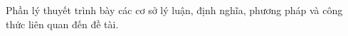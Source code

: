 Phần lý thuyết trình bày các cơ sở lý luận, định nghĩa, phương pháp và công thức liên quan đến đề tài.